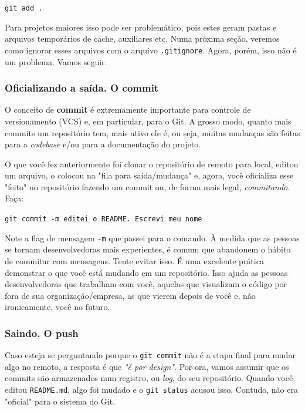 \documentclass{article}
\begin{document}
  \vspace{1ex}
  \texttt{git add .}
  \vspace{1ex}

  Para projetos maiores isso pode ser problemático, pois estes geram pastas e arquivos temporários de cache, auxiliares etc. Numa próxima
  seção, veremos como ignorar esses arquivos com o arquivo \texttt{.gitignore}. Agora, porém, isso não é um problema. 
  Vamos seguir. 

  \subsubsection{Oficializando a saída. O commit}

  O conceito de \textbf{commit} é extremamente importante para controle de versionamento (VCS) e, em particular, para o Git. 
  A grosso modo, quanto mais commits um repositório tem, mais ativo ele é, ou seja, muitas mudanças são feitas para a \textit{codebase}
  e/ou para a documentação do projeto.

  O que você fez anteriormente foi clonar o repositório de remoto para local, editou um arquivo, 
  o colocou na "fila para saída/mudança" e, agora, você oficializa esse "feito" no repositório fazendo um commit ou,
  de forma mais legal, \textit{commitando}. Faça: 

  \vspace{1ex}
  \texttt{git commit -m \textquotesingle\!\textquotesingle editei o README. Escrevi meu nome\textquotesingle\!\textquotesingle}
  \vspace{1ex}

  Note a flag de mensagem \texttt{-m} que passei para o comando. À medida que as pessoas se tornam desenvolvedoras mais experientes, 
  é comum que abandonem o hábito de commitar com mensagens. Tente evitar isso. É uma excelente prática demonstrar o que você está 
  mudando em um repositório. Isso ajuda as pessoas desenvolvedoras que trabalham com você, aquelas que visualizam o código por fora
  de sua organização/empresa, as que vierem depois de você e, não ironicamente, você no futuro. 

  \subsubsection{Saindo. O push}
  \label{sec:push}

  Caso esteja se perguntando porque o \texttt{git commit} não é a etapa final para mudar algo no remoto, a resposta é que 
  \textit{"é por design"}. Por ora, vamos assumir que os commits são armazenados num registro, ou \textit{log}, do seu repositório. 
  Quando você editou \texttt{README.md}, algo foi mudado e o \texttt{git status} acusou isso. Contudo, não era "oficial" para o 
  sistema do Git. 
  
\end{document}
